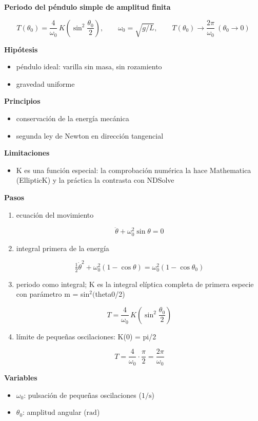 \documentclass[10pt,openany]{book}
\begin{document}
\begin{tcolorbox}[title={Desarrollos del modelo}, studiumdef, breakable]

\noindent\textbf{Periodo del péndulo simple de amplitud finita}

\begin{equation}
T(\theta_0) = \frac{4}{\omega_0}\,K\!\left(\sin^{2}\frac{\theta_0}{2}\right),\qquad \omega_0 = \sqrt{g/L},\qquad T(\theta_0) \to \frac{2\pi}{\omega_0}\ (\theta_0 \to 0)
\label{eq:m02-periodo}
\end{equation}

\noindent\textbf{Hipótesis}
\begin{itemize}
\item péndulo ideal: varilla sin masa, sin rozamiento
\item gravedad uniforme
\end{itemize}

\noindent\textbf{Principios}
\begin{itemize}
\item conservación de la energía mecánica
\item segunda ley de Newton en dirección tangencial
\end{itemize}

\noindent\textbf{Limitaciones}
\begin{itemize}
\item K es una función especial: la comprobación numérica la hace Mathematica (EllipticK) y la práctica la contrasta con NDSolve
\end{itemize}

\noindent\textbf{Pasos}
\begin{enumerate}
\item
ecuación del movimiento

\[
\ddot\theta + \omega_0^{2}\sin\theta = 0
\]
\item
integral primera de la energía

\[
\tfrac12\dot\theta^{2} + \omega_0^{2}(1 - \cos\theta) = \omega_0^{2}(1 - \cos\theta_0)
\]
\item
periodo como integral; K es la integral elíptica completa de primera especie con parámetro m = sin\(^2(\)theta0/2)

\[
T = \frac{4}{\omega_0}\,K\!\left(\sin^{2}\frac{\theta_0}{2}\right)
\]
\item
límite de pequeñas oscilaciones: K(0) = pi/2

\[
T = \frac{4}{\omega_0}\cdot\frac{\pi}{2} = \frac{2\pi}{\omega_0}
\]
\end{enumerate}

\noindent\textbf{Variables}
\begin{itemize}
\item $\omega_0$: pulsación de pequeñas oscilaciones ($\mathrm{1/s}$)
\item $\theta_0$: amplitud angular ($\mathrm{rad}$)
\end{itemize}


\end{tcolorbox}
\end{document}
